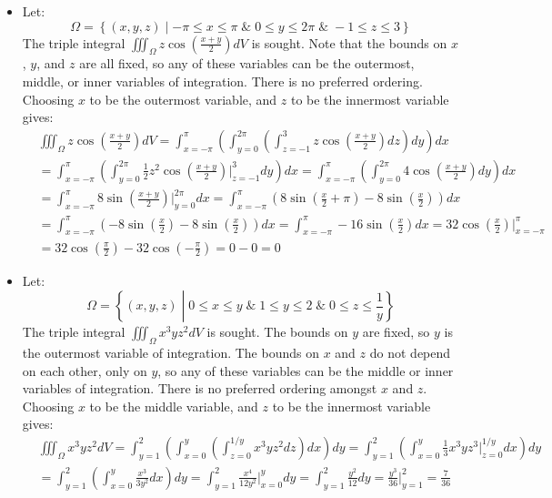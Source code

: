 \documentclass{article}
\begin{document}
\begin{itemize}
\item Let: 
\[\Omega = \left\{(x,y,z) \middle| -\pi \leq x \leq \pi \;\&\; 0 \leq y \leq 2\pi \;\&\; -1 \leq z \leq 3 \right\}\] 
The triple integral \(\iiint_{\Omega} z\cos\left(\frac{x+y}{2}\right) dV\) is sought. Note that the bounds on \(x\), \(y\), and \(z\) are all fixed, so any of these variables can be the outermost, middle, or inner variables of integration. There is no preferred ordering. Choosing \(x\) to be the outermost variable, and \(z\) to be the innermost variable gives:
\begin{align*}
& \iiint_{\Omega} z\cos\left(\frac{x+y}{2}\right) dV = \int_{x = -\pi}^{\pi} \left(\int_{y = 0}^{2\pi} \left(\int_{z = -1}^3 z\cos\left(\frac{x+y}{2}\right)dz\right)dy\right)dx \\
& = \int_{x = -\pi}^{\pi} \left(\int_{y = 0}^{2\pi} \frac{1}{2}z^2\cos\left(\frac{x+y}{2}\right)\Bigg|_{z = -1}^3 dy\right)dx 
= \int_{x = -\pi}^{\pi} \left(\int_{y = 0}^{2\pi} 4\cos\left(\frac{x+y}{2}\right) dy\right)dx \\  
& = \int_{x = -\pi}^{\pi} 8\sin\left(\frac{x+y}{2}\right)\Bigg|_{y = 0}^{2\pi}dx 
= \int_{x = -\pi}^{\pi} \left(8\sin\left(\frac{x}{2} + \pi\right) - 8\sin\left(\frac{x}{2}\right)\right)dx \\
& = \int_{x = -\pi}^{\pi} \left(-8\sin\left(\frac{x}{2}\right) - 8\sin\left(\frac{x}{2}\right)\right)dx 
= \int_{x = -\pi}^{\pi} -16\sin\left(\frac{x}{2}\right)dx 
= 32\cos\left(\frac{x}{2}\right)\Bigg|_{x = -\pi}^{\pi} \\
& = 32\cos\left(\frac{\pi}{2}\right) - 32\cos\left(-\frac{\pi}{2}\right) 
= 0 - 0 = 0
\end{align*}



\item Let: 
\[\Omega = \left\{(x,y,z) \middle| 0 \leq x \leq y \;\&\; 1 \leq y \leq 2 \;\&\; 0 \leq z \leq \frac{1}{y} \right\}\] 
The triple integral \(\iiint_{\Omega} x^3 y z^2 dV\) is sought. The bounds on \(y\) are fixed, so \(y\) is the outermost variable of integration. The bounds on \(x\) and \(z\) do not depend on each other, only on \(y\), so any of these variables can be the middle or inner variables of integration. There is no preferred ordering amongst \(x\) and \(z\). Choosing \(x\) to be the middle variable, and \(z\) to be the innermost variable gives:
\begin{align*}
& \iiint_{\Omega} x^3 y z^2 dV 
= \int_{y = 1}^2 \left(\int_{x = 0}^y \left(\int_{z = 0}^{1/y} x^3 y z^2 dz\right)dx\right)dy 
= \int_{y = 1}^2 \left(\int_{x = 0}^y \frac{1}{3} x^3 y z^3 \bigg|_{z = 0}^{1/y} dx\right)dy \\  
& = \int_{y = 1}^2 \left(\int_{x = 0}^y \frac{x^3}{3y^2} dx\right)dy 
= \int_{y = 1}^2 \frac{x^4}{12y^2}\bigg|_{x = 0}^y dy 
= \int_{y = 1}^2 \frac{y^2}{12} dy 
= \frac{y^3}{36}\bigg|_{y = 1}^2 
= \frac{7}{36}
\end{align*}




\end{itemize}
\end{document}
